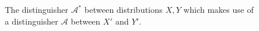 \begin{figure}[t]
\begin{algorithm}[H]
    \caption{\label{alg.pres-distinguisher}
    The distinguisher $\mathcal{A}^*$
    between distributions $X, Y$
    which makes use of a distinguisher $\mathcal{A}$ between
    $X'$ and $Y'$.}
    \begin{algorithmic}[1]
            \State{}
        \EndFunction
    \end{algorithmic}
\end{algorithm}
\end{figure}
